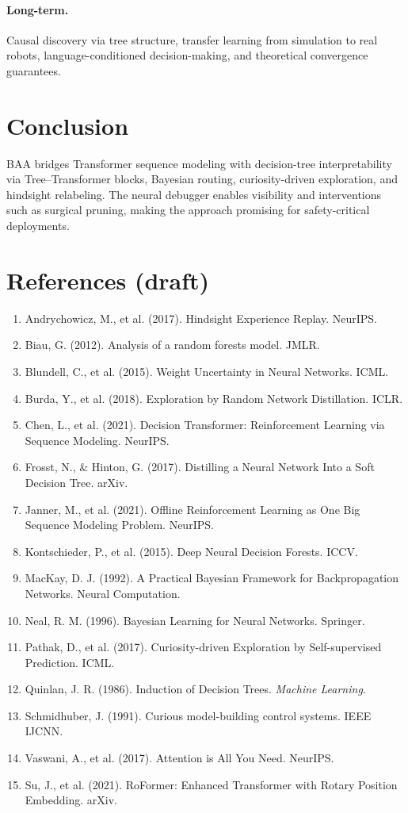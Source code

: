 \documentclass[11pt]{article}
\begin{document}
\paragraph{Long-term.} Causal discovery via tree structure, transfer learning from simulation to real robots, language-conditioned decision-making, and theoretical convergence guarantees.

\section{Conclusion}\label{sec:conclusion}
BAA bridges Transformer sequence modeling with decision-tree interpretability via Tree--Transformer blocks, Bayesian routing, curiosity-driven exploration, and hindsight relabeling. The neural debugger enables visibility and interventions such as surgical pruning, making the approach promising for safety-critical deployments.

\section*{References (draft)}
\begin{enumerate}
\item Andrychowicz, M., et al. (2017). Hindsight Experience Replay. NeurIPS.
\item Biau, G. (2012). Analysis of a random forests model. JMLR.
\item Blundell, C., et al. (2015). Weight Uncertainty in Neural Networks. ICML.
\item Burda, Y., et al. (2018). Exploration by Random Network Distillation. ICLR.
\item Chen, L., et al. (2021). Decision Transformer: Reinforcement Learning via Sequence Modeling. NeurIPS.
\item Frosst, N., \& Hinton, G. (2017). Distilling a Neural Network Into a Soft Decision Tree. arXiv.
\item Janner, M., et al. (2021). Offline Reinforcement Learning as One Big Sequence Modeling Problem. NeurIPS.
\item Kontschieder, P., et al. (2015). Deep Neural Decision Forests. ICCV.
\item MacKay, D. J. (1992). A Practical Bayesian Framework for Backpropagation Networks. Neural Computation.
\item Neal, R. M. (1996). Bayesian Learning for Neural Networks. Springer.
\item Pathak, D., et al. (2017). Curiosity-driven Exploration by Self-supervised Prediction. ICML.
\item Quinlan, J. R. (1986). Induction of Decision Trees. \emph{Machine Learning}.
\item Schmidhuber, J. (1991). Curious model-building control systems. IEEE IJCNN.
\item Vaswani, A., et al. (2017). Attention is All You Need. NeurIPS.
\item Su, J., et al. (2021). RoFormer: Enhanced Transformer with Rotary Position Embedding. arXiv.
\end{enumerate}
\end{document}
